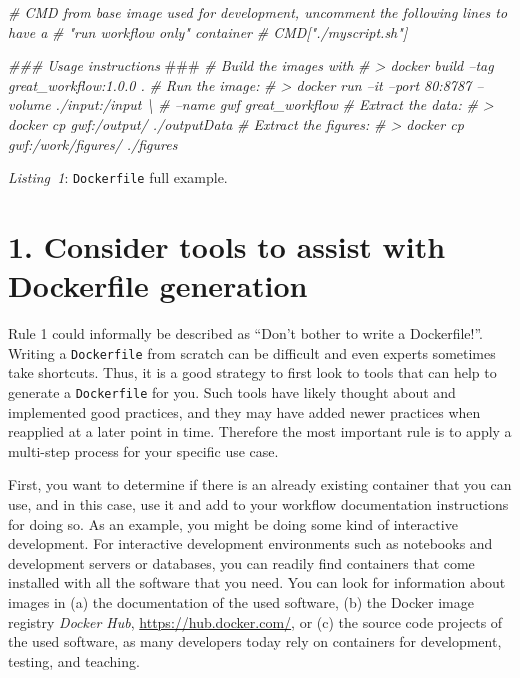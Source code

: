 \documentclass[10pt,letterpaper]{article}
\newenvironment{Shaded}{\begin{snugshade}}{\end{snugshade}}
\newcommand{\AlertTok}[1]{\textcolor[rgb]{0.94,0.16,0.16}{#1}}
\newcommand{\CommentTok}[1]{\textcolor[rgb]{0.56,0.35,0.01}{\textit{#1}}}
\begin{document}
\begin{Shaded}
\begin{Highlighting}[]
\CommentTok{# CMD from base image used for development, uncomment the following lines to have a }
\CommentTok{# "run workflow only" container}
\CommentTok{# CMD["./myscript.sh"]}

\CommentTok{### Usage instructions }\AlertTok{###}
\CommentTok{# Build the images with}
\CommentTok{# > docker build --tag great_workflow:1.0.0 .}
\CommentTok{# Run the image:}
\CommentTok{# > docker run --it --port 80:8787 --volume ./input:/input \textbackslash{}}
\CommentTok{#     --name gwf great_workflow}
\CommentTok{# Extract the data:}
\CommentTok{# > docker cp gwf:/output/ ./outputData}
\CommentTok{# Extract the figures:}
\CommentTok{# > docker cp gwf:/work/figures/ ./figures}
\end{Highlighting}
\end{Shaded}

\normalsize

\emph{Listing~1}: \texttt{Dockerfile} full example.

\hypertarget{consider-tools-to-assist-with-dockerfile-generation}{%
\section*{1. Consider tools to assist with Dockerfile
generation}\label{consider-tools-to-assist-with-dockerfile-generation}}

  \label{rule:tools} 

Rule 1 could informally be described as ``Don't bother to write a
Dockerfile!''. Writing a \texttt{Dockerfile} from scratch can be
difficult and even experts sometimes take shortcuts. Thus, it is a good
strategy to first look to tools that can help to generate a
\texttt{Dockerfile} for you. Such tools have likely thought about and
implemented good practices, and they may have added newer practices when
reapplied at a later point in time. Therefore the most important rule is
to apply a multi-step process for your specific use case.

First, you want to determine if there is an already existing container
that you can use, and in this case, use it and add to your workflow
documentation instructions for doing so. As an example, you might be
doing some kind of interactive development. For interactive development
environments such as notebooks and development servers or databases, you
can readily find containers that come installed with all the software
that you need. You can look for information about images in (a) the
documentation of the used software, (b) the Docker image registry
\emph{Docker Hub}, \url{https://hub.docker.com/}, or (c) the source code
projects of the used software, as many developers today rely on
containers for development, testing, and teaching.
\end{document}
